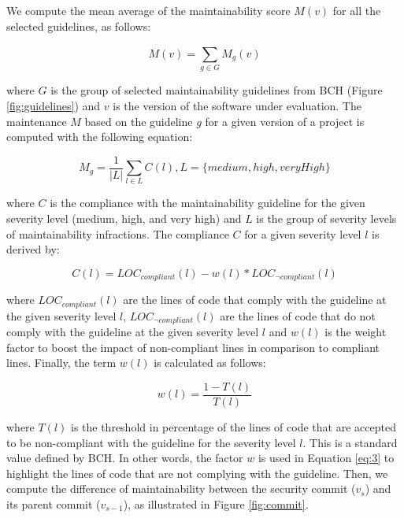 \documentclass[10pt,conference]{IEEEtran}
\begin{document}
We compute the mean average of the maintainability score $M(v)$ for all the
selected guidelines, as follows:

\begin{equation}
    M(v) = \sum_{g \in G}^{} M_{g}(v)
\end{equation}

\noindent
where $G$ is the group of selected maintainability guidelines from BCH (Figure
\ref{fig:guidelines}) and $v$ is the version of the software under evaluation.
The maintenance $M$ based on the guideline $g$ for a given version of a project
is computed with the following equation:

\begin{equation}
    M_{g} = \frac{1}{|L|} \sum_{l \in L}^{} C(l) , L = \{medium, high, veryHigh\}
\end{equation}

\noindent
where $C$ is the compliance with the maintainability guideline for the given
severity level (medium, high, and very high) and $L$ is the group of severity
levels of maintainability infractions. The compliance $C$ for a given severity
level $l$ is derived by:

\begin{equation}\label{eq:3}
    C(l) = LOC_{compliant}(l) - w(l) * LOC_{\neg compliant}(l)
\end{equation}

\noindent
where $LOC_{compliant}(l)$ are the lines of code that comply with the guideline
at the given severity level $l$, $LOC_{\neg compliant}(l)$ are the lines of code
that do not comply with the guideline at the given severity level $l$ and $w(l)$
is the weight factor to boost the impact of non-compliant lines in comparison to
compliant lines. Finally, the term $w(l)$ is calculated as follows:

\begin{equation}
    w(l) = \frac{1 - T(l)}{T(l)}
\end{equation}

\noindent
where $T(l)$ is the threshold in percentage of the lines of code that are
accepted to be non-compliant with the guideline for the severity level $l$. This
is a standard value defined by BCH. In other words, the factor $w$ is used in
Equation \ref{eq:3} to highlight the lines of code that are not complying with
the guideline. Then, we compute the difference of maintainability between the
security commit ($v_{s}$) and its parent commit ($v_{s-1}$), as illustrated in
Figure \ref{fig:commit}.
\end{document}
